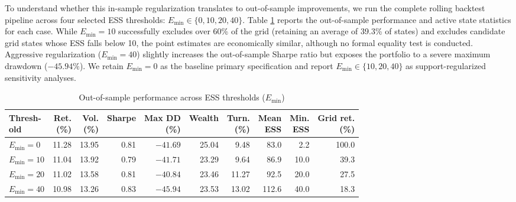 \documentclass[smallextended]{svjour3}
\begin{document}
To understand whether this in-sample regularization translates to out-of-sample improvements, we run the complete rolling backtest pipeline across four selected ESS thresholds: $E_{\min} \in \{0, 10, 20, 40\}$. Table \ref{tab:ess_backtest} reports the out-of-sample performance and active state statistics for each case. While $E_{\min}=10$ successfully excludes over 60\% of the grid (retaining an average of 39.3\% of states) and excludes candidate grid states whose ESS falls below 10, the point estimates are economically similar, although no formal equality test is conducted. Aggressive regularization ($E_{\min}=40$) slightly increases the out-of-sample Sharpe ratio but exposes the portfolio to a severe maximum drawdown ($-45.94\%$). We retain $E_{\min}=0$ as the baseline primary specification and report $E_{\min}\in\{10,20,40\}$ as support-regularized sensitivity analyses.

\begin{table}[htbp]
\centering
\caption{Out-of-sample performance across ESS thresholds ($E_{\min}$)}
\label{tab:ess_backtest}
\footnotesize
\begin{adjustbox}{max width=\textwidth}
\begin{tabular}{lrrrrrrrrr}
\toprule
\makecell[l]{\textbf{Thresh-}\\\textbf{old}} & \makecell[r]{\textbf{Ret.}\\\textbf{(\%)}} & \makecell[r]{\textbf{Vol.}\\\textbf{(\%)}} & \textbf{Sharpe} & \makecell[r]{\textbf{Max DD}\\\textbf{(\%)}} & \textbf{Wealth} & \makecell[r]{\textbf{Turn.}\\\textbf{(\%)}} & \makecell[r]{\textbf{Mean}\\\textbf{ESS}} & \makecell[r]{\textbf{Min.}\\\textbf{ESS}} & \makecell[r]{\textbf{Grid ret.}\\\textbf{(\%)}} \\
\midrule
$E_{\min} = 0$ & 11.28 & 13.95 & 0.81 & $-41.69$ & 25.04 & 9.48 & 83.0 & 2.2 & 100.0 \\
$E_{\min} = 10$ & 11.04 & 13.92 & 0.79 & $-41.71$ & 23.29 & 9.64 & 86.9 & 10.0 & 39.3 \\
$E_{\min} = 20$ & 11.02 & 13.58 & 0.81 & $-40.84$ & 23.46 & 11.27 & 92.5 & 20.0 & 27.5 \\
$E_{\min} = 40$ & 10.98 & 13.26 & 0.83 & $-45.94$ & 23.53 & 13.02 & 112.6 & 40.0 & 18.3 \\
\bottomrule
\end{tabular}
\end{adjustbox}
\end{table}
\end{document}
